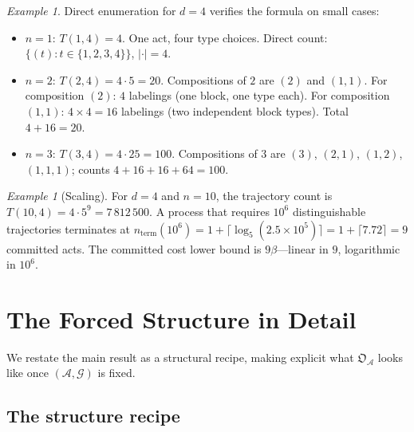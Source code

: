 \documentclass[11pt,twocolumn,a4paper]{article}
\theoremstyle{thmstyle}
\theoremstyle{definition}
\theoremstyle{remark}
\newtheorem{example}[theorem]{Example}
\newcommand{\Graph}{\mathcal{G}}
\newcommand{\Agent}{\mathcal{A}}
\newcommand{\floor}{\beta}
\newcommand{\OpStr}{\mathfrak{O}}
\begin{document}
\begin{example}
\label{ex:small_cases}
Direct enumeration for $d = 4$ verifies the formula on small
cases:
\begin{itemize}[nosep,leftmargin=*]
\item $n = 1$: $T(1, 4) = 4$. One act, four type choices.
Direct count: $\{(t) : t \in \{1,2,3,4\}\}$, $|\cdot| = 4$.
\item $n = 2$: $T(2, 4) = 4 \cdot 5 = 20$. Compositions of $2$ are
$(2)$ and $(1, 1)$. For composition $(2)$: $4$ labelings (one
block, one type each). For composition $(1, 1)$: $4 \times 4 =
16$ labelings (two independent block types). Total $4 + 16 = 20$.
\item $n = 3$: $T(3, 4) = 4 \cdot 25 = 100$. Compositions of $3$
are $(3)$, $(2, 1)$, $(1, 2)$, $(1, 1, 1)$; counts $4 + 16 + 16 +
64 = 100$.
\end{itemize}
\end{example}

\begin{example}[Scaling]
\label{ex:scaling}
For $d = 4$ and $n = 10$, the trajectory count is
$T(10, 4) = 4 \cdot 5^9 = 7\,812\,500$. A process that requires
$10^6$ distinguishable trajectories terminates at
$n_{\mathrm{term}}(10^6) = 1 + \lceil \log_5(2.5 \times 10^5)
\rceil = 1 + \lceil 7.72 \rceil = 9$ committed acts. The
committed cost lower bound is $9 \floor$---linear in $9$,
logarithmic in $10^6$.
\end{example}

\section{The Forced Structure in Detail}
\label{sec:detail}

We restate the main result as a structural recipe, making explicit
what $\OpStr_\Agent$ looks like once $(\Agent, \Graph)$ is fixed.

\subsection{The structure recipe}
\end{document}
